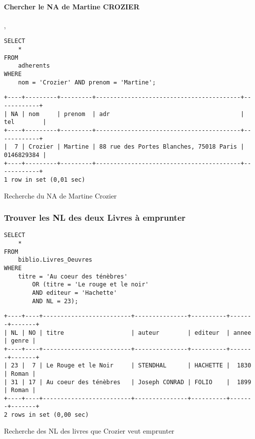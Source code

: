 \documentclass{article}
\begin{document}
\paragraph{Chercher le NA de Martine CROZIER},
\begin{listing}[H]
\begin{verbatim}
SELECT 
    *
FROM
    adherents
WHERE
    nom = 'Crozier' AND prenom = 'Martine';
\end{verbatim}
\begin{verbatim}
+----+---------+---------+-----------------------------------------+------------+
| NA | nom     | prenom  | adr                                     | tel        |
+----+---------+---------+-----------------------------------------+------------+
|  7 | Crozier | Martine | 88 rue des Portes Blanches, 75018 Paris | 0146829384 |
+----+---------+---------+-----------------------------------------+------------+
1 row in set (0,01 sec)
\end{verbatim}
\caption{Recherche du NA de Martine Crozier}
\end{listing}

\subsubsection{Trouver les NL des deux Livres à emprunter}
\begin{listing}[H]
\begin{verbatim}
SELECT 
    *
FROM
    biblio.Livres_Oeuvres
WHERE
    titre = 'Au coeur des ténèbres'
        OR (titre = 'Le rouge et le noir'
        AND editeur = 'Hachette'
        AND NL = 23);
\end{verbatim}
\begin{verbatim}
+----+----+-------------------------+---------------+----------+-------+-------+
| NL | NO | titre                   | auteur        | editeur  | annee | genre |
+----+----+-------------------------+---------------+----------+-------+-------+
| 23 |  7 | Le Rouge et le Noir     | STENDHAL      | HACHETTE |  1830 | Roman |
| 31 | 17 | Au coeur des ténèbres   | Joseph CONRAD | FOLIO    |  1899 | Roman |
+----+----+-------------------------+---------------+----------+-------+-------+
2 rows in set (0,00 sec)
\end{verbatim}
\caption{Recherche des NL des livres que Crozier veut emprunter}
\end{listing}
\end{document}
